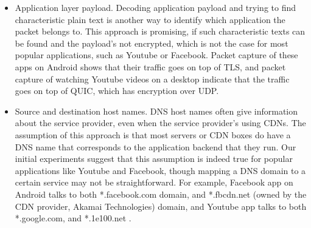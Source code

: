 \begin{itemize}
\begin{itemize}
  \item Application layer payload. Decoding application payload and trying to find characteristic plain text is another way to identify which application the packet belongs to. This approach is promising, if such characteristic texts can be found and the payload's not encrypted, which is not the case for most popular applications, such as Youtube or Facebook. Packet capture of these apps on Android shows that their traffic goes on top of TLS, and packet capture of watching Youtube videos on a desktop indicate that the traffic goes on top of QUIC, which has encryption over UDP.

  \item Source and destination host names. DNS host names often give information about the service provider, even when the service provider's using CDNs. The assumption of this approach is that most servers or CDN boxes do have a DNS name that corresponds to the application backend that they run. Our initial experiments suggest that this assumption is indeed true for popular applications like Youtube and Facebook, though mapping a DNS domain to a certain service may not be straightforward. For example, Facebook app on Android talks to both *.facebook.com domain, and *.fbcdn.net (owned by the CDN provider, Akamai Technologies) domain, and Youtube app talks to both *.google.com, and *.1e100.net .

  \end{itemize} 

\end{itemize}